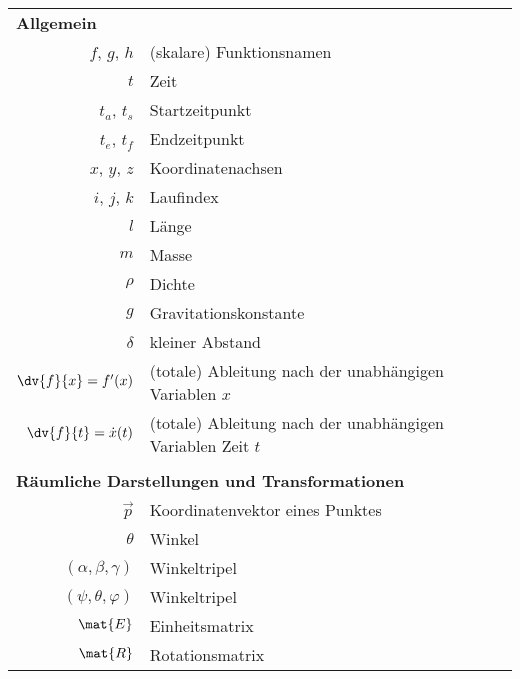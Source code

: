 	\begin{table}
		\centering
		\begin{tabular}{rl}
			\multicolumn{2}{l}{\textbf{Allgemein}}                                                                       \\
			\(f\), \(g\), \(h\) & (skalare) Funktionsnamen                                      \\
			\(t\) & Zeit                                                          \\
			\(t_a\), \(t_s\) & Startzeitpunkt                                                \\
			\(t_e\), \(t_f\) & Endzeitpunkt                                                  \\
			\(x\), \(y\), \(z\) & Koordinatenachsen                                             \\
			\(i\), \(j\), \(k\) & Laufindex                                                     \\
			\(l\) & Länge                                                         \\
			\(m\) & Masse                                                         \\
			\(\rho\) & Dichte                                                        \\
			\(g\) & Gravitationskonstante                                         \\
			\(\delta\) & kleiner Abstand                                               \\
			\( \dv{f}{x} = f'(x) \) & (totale) Ableitung nach der unabhängigen Variablen \(x\)      \\
			\( \dv{f}{t} = \dot{x}(t) \) & (totale) Ableitung nach der unabhängigen Variablen Zeit \(t\) \\&\\
			\multicolumn{2}{l}{\textbf{Räumliche Darstellungen und Transformationen}} \\
			\(\vec{p}\) & Koordinatenvektor eines Punktes \\
			\(\theta\) & Winkel                          \\
			\((\alpha, \beta, \gamma)\) & Winkeltripel                    \\
			\((\psi, \theta, \varphi)\) & Winkeltripel                    \\
			\(\mat{E}\) & Einheitsmatrix                  \\
			\(\mat{R}\) & Rotationsmatrix                 \\

\end{tabular}
\end{table}
